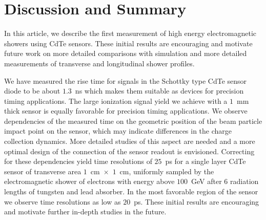 
\section{Discussion and Summary}
\label{sec:summary} 


In this article, we describe the first measurement of high energy 
electromagnetic showers using CdTe sensors. 
These initial results are encouraging and motivate future work on 
more detailed comparisons with simulation and more detailed 
measurements of transverse and longitudinal shower profiles.



We have measured the rise time for signals in the Schottky type CdTe sensor diode to be about 
$1.3$~ns which makes them suitable as devices for precision timing applications.
The large ionization signal yield we achieve with a $1$~mm thick sensor is equally favorable for precision
timing applications.
We observe dependencies of the measured time on the geometric position of the
beam particle impact point on the sensor, which may indicate differences in the charge collection dynamics.
More detailed studies of this aspect are needed and a more optimal design of the 
connection of the sensor readout is envisioned. Correcting for these dependencies yield time resolutions
of $25$~ps for a single layer CdTe sensor of transverse area $1$~cm~$\times$~$1$~cm,
 uniformly sampled by the electromagnetic shower of electrons with energy above $100$~GeV 
after $6$ radiation lengths of tungsten and lead absorber. In the most favorable region of the sensor we 
observe time resolutions as low as $20$~ps. These initial results are encouraging and motivate 
further in-depth studies in the future.



